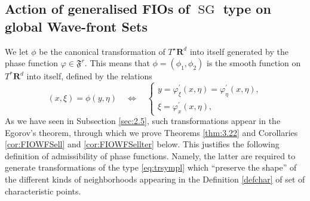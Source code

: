 \documentclass[12pt,a4paper,reqno]{amsart}
\numberwithin{equation}{section}
\numberwithin{thm}{section}
\theoremstyle{definition}
\theoremstyle{remark}
\begin{document}
\subsection{Action of generalised FIOs of ${\operatorname{SG}}$ type on
global Wave-front Sets}\label{subs:4.2}
We let $\phi$ be the canonical transformation
of $T^\star {\mathbf R^{{d}}}$ into itself generated by the phase function
$\varphi \in {\mathfrak{F}^r}$. This means that $\phi = (\phi_1,\phi_2)$ is
the smooth function on $T^*{\mathbf R^{d}}$ into itself, defined by the
relations
\begin{equation}
(x,\xi )=\phi (y,\eta )
\quad \Longleftrightarrow \quad
\label{eq:trsympl}
  \begin{cases}
     y  = \varphi^\prime_{\xi} (x,\eta) =  \varphi^\prime_{\eta} (x,\eta),
   \\[1ex]
     \xi = \varphi^\prime_x (x, \eta),
  \end{cases}
\end{equation}
As we have seen in Subsection \ref{sec:2.5}, such transformations
appear in the Egorov's theorem, through which we prove
Theorems \ref{thm:3.22} and Corollaries \ref{cor:FIOWFSell} and \ref{cor:FIOWFSellter} 
below. This justifies the following definition
of admissibility of phase functions. Namely, the latter are required to
generate transformations of the type \eqref{eq:trsympl} which ``preserve
the shape'' of the different kinds of neighborhoods 
appearing in the Definition \ref{defchar} of set of characteristic points.
\end{document}
